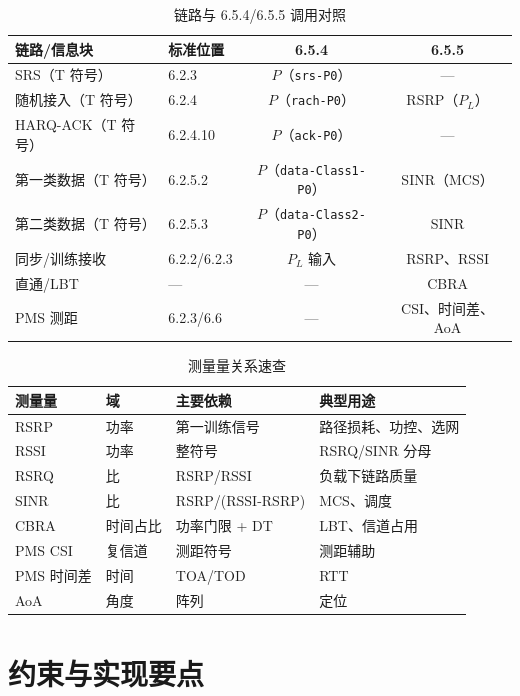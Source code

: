 \documentclass[11pt,a4paper]{ctexart}
\begin{document}
\begin{longtable}{L{4.2cm}L{2.8cm}cc}
\caption{链路与 6.5.4/6.5.5 调用对照\label{tab:6545-link}} \\
\toprule
\textbf{链路/信息块} & \textbf{标准位置} & \textbf{6.5.4} & \textbf{6.5.5} \\
\midrule
SRS（T 符号） & 6.2.3 & $P$（\texttt{srs-P0}） & --- \\
随机接入（T 符号） & 6.2.4 & $P$（\texttt{rach-P0}） & RSRP（$P_L$） \\
HARQ-ACK（T 符号） & 6.2.4.10 & $P$（\texttt{ack-P0}） & --- \\
第一类数据（T 符号） & 6.2.5.2 & $P$（\texttt{data-Class1-P0}） & SINR（MCS） \\
第二类数据（T 符号） & 6.2.5.3 & $P$（\texttt{data-Class2-P0}） & SINR \\
同步/训练接收 & 6.2.2/6.2.3 & $P_L$ 输入 & RSRP、RSSI \\
直通/LBT & --- & --- & CBRA \\
PMS 测距 & 6.2.3/6.6 & --- & CSI、时间差、AoA \\
\bottomrule
\end{longtable}

\begin{longtable}{L{2.5cm}L{2cm}L{4cm}L{5.5cm}}
\caption{测量量关系速查\label{tab:6545-meas-rel}} \\
\toprule
\textbf{测量量} & \textbf{域} & \textbf{主要依赖} & \textbf{典型用途} \\
\midrule
RSRP & 功率 & 第一训练信号 & 路径损耗、功控、选网 \\
RSSI & 功率 & 整符号 & RSRQ/SINR 分母 \\
RSRQ & 比 & RSRP/RSSI & 负载下链路质量 \\
SINR & 比 & RSRP/(RSSI-RSRP) & MCS、调度 \\
CBRA & 时间占比 & 功率门限 + DT & LBT、信道占用 \\
PMS CSI & 复信道 & 测距符号 & 测距辅助 \\
PMS 时间差 & 时间 & TOA/TOD & RTT \\
AoA & 角度 & 阵列 & 定位 \\
\bottomrule
\end{longtable}

\section{约束与实现要点}
\end{document}
